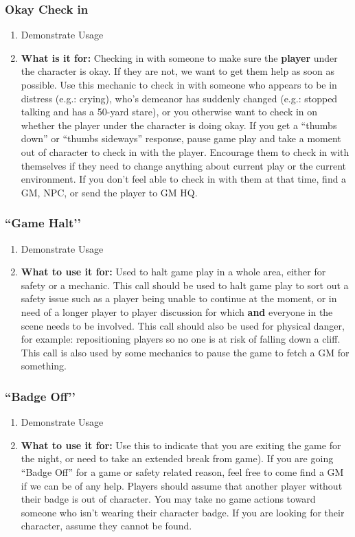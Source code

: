 \documentclass[green]{GL2020}
\begin{document}
\subsubsection*{Okay Check in}
\begin{enumerate}
	\item Demonstrate Usage
	\item \textbf{What is it for:} Checking in with someone to make sure the \textbf{player} under the character is okay. If they are not, we want to get them help as soon as possible. Use this mechanic to check in with someone who appears to be in distress (e.g.: crying), who’s demeanor has suddenly changed (e.g.: stopped talking and has a 50-yard stare), or you otherwise want to check in on whether the player under the character is doing okay. If you get a ``thumbs down'' or ``thumbs sideways'' response, pause game play and take a moment out of character to check in with the player. Encourage them to check in with themselves if they need to change anything about current play or the current environment. If you don’t feel able to check in with them at that time, find a GM, NPC,  or send the player to GM HQ.
\end{enumerate}

\subsubsection*{``Game Halt’’}
	\begin{enumerate}
		\item Demonstrate Usage
		\item \textbf{What to use it for:} Used to halt game play in a whole area, either for safety or a mechanic. This call should be used to halt game play to sort out a safety issue such as a player being unable to continue at the moment, or in need of a longer player to player discussion for which \textbf{and} everyone in the scene needs to be involved. This call should also be used for physical danger, for example: repositioning players so no one is at risk of falling down a cliff. This call is also used by some mechanics to pause the game to fetch a GM for something.
\end{enumerate}
	
\subsubsection*{``Badge Off’’}
	\begin{enumerate}
		\item Demonstrate Usage
		\item \textbf{What to use it for:} Use this to indicate that you are exiting the game for the night, or need to take an extended break from game). If you are going ``Badge Off'' for a game or safety related reason, feel free to come find a GM if we can be of any help. Players should assume that another player without their badge is out of character. You may take no game actions toward someone who isn’t wearing their character badge. If you are looking for their character, assume they cannot be found.
\end{enumerate}		
	
\end{document}
